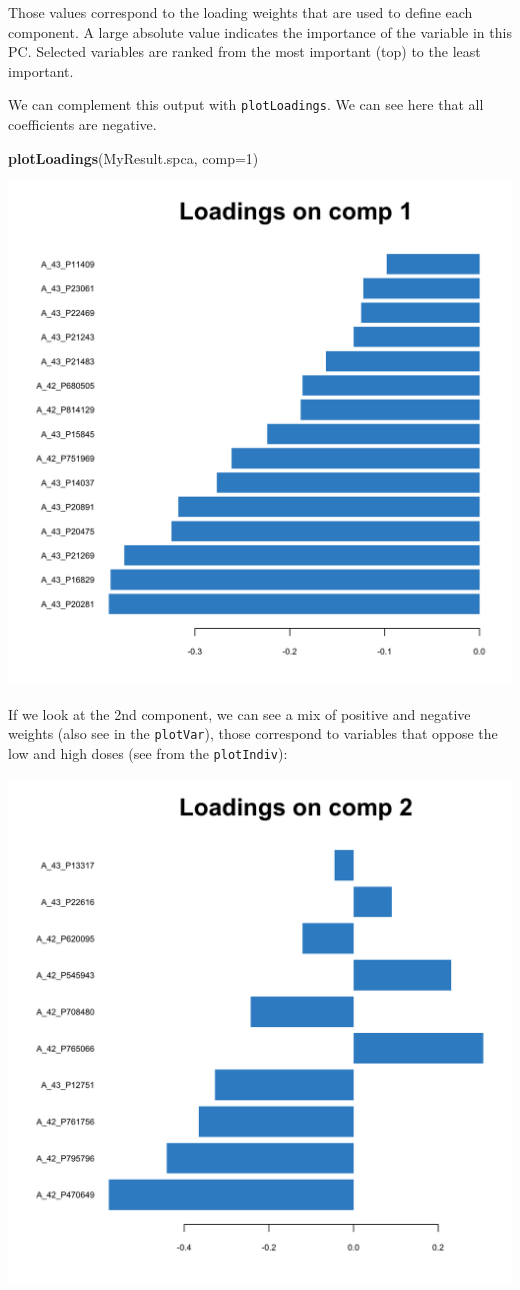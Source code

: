 \documentclass[]{book}
\newenvironment{Shaded}{\begin{snugshade}}{\end{snugshade}}
\newcommand{\DataTypeTok}[1]{\textcolor[rgb]{0.13,0.29,0.53}{#1}}
\newcommand{\DecValTok}[1]{\textcolor[rgb]{0.00,0.00,0.81}{#1}}
\newcommand{\KeywordTok}[1]{\textcolor[rgb]{0.13,0.29,0.53}{\textbf{#1}}}
\newcommand{\NormalTok}[1]{#1}
\begin{document}
Those values correspond to the loading weights that are used to define each component. A large absolute value indicates the importance of the variable in this PC. Selected variables are ranked from the most important (top) to the least important.

We can complement this output with \texttt{plotLoadings}. We can see here that all coefficients are negative.

\begin{Shaded}
\begin{Highlighting}[]
\KeywordTok{plotLoadings}\NormalTok{(MyResult.spca, }\DataTypeTok{comp=}\DecValTok{1}\NormalTok{)}
\end{Highlighting}
\end{Shaded}

\begin{center}\includegraphics[width=0.75\linewidth,]{Figures/03-pca-liver-plotLoadings-1} \end{center}

If we look at the 2nd component, we can see a mix of positive and negative weights (also see in the \texttt{plotVar}), those correspond to variables that oppose the low and high doses (see from the \texttt{plotIndiv}):

\begin{center}\includegraphics[width=0.75\linewidth,]{Figures/03-pca-liver-comp2-1} \end{center}
\end{document}
